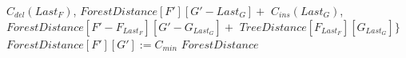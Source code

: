 \begin{algorithm}
\begin{algorithmic}[1]
              \Indent
                \State $C_{del}(Last_{F})$,
              \EndIndent
              \State $ForestDistance[F'][G' - Last_{G}] +$
              \Indent
                \State $C_{ins}(Last_{G})$,
              \EndIndent
              \State $ForestDistance[F' - F_{Last_{F}}][G' - G_{Last_{G}}] +$
              \Indent
                \State $TreeDistance[F_{Last_{F}}][G_{Last_{G}}]\}$
              \EndIndent
            \EndIndent
            \State $ForestDistance[F'][G'] := C_{min}$
          \EndIf
        \EndFor
      \EndFor
      \State \Return $ForestDistance$
    \EndProcedure
  \end{algorithmic}
\end{algorithm}

